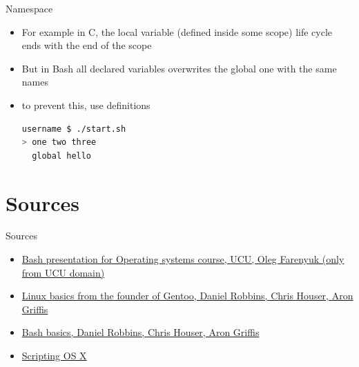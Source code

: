 \documentclass[usenames,dvipsnames,10pt,aspectratio=169]{beamer}
\begin{document}
\begin{frame}[fragile]{Namespace}
    \begin{itemize}
        \item For example in C, the local variable (defined inside some scope) life cycle ends with the end of the scope
        \item But in Bash all declared variables overwrites the global one with the same names
        \item to prevent this, use  definitions
        
        \begin{lstlisting}[language=Bash, style=shellstyle]
username $ ./start.sh
> one two three 
  global hello\end{lstlisting}
    \end{itemize}
\end{frame}

\section{Sources}
\begin{frame}{Sources}
\begin{itemize}
    \item \href{https://cms.ucu.edu.ua/pluginfile.php/181565/mod_resource/content/3/os_p01_bash.pdf}{Bash presentation for Operating systems course, UCU, Oleg Farenyuk (only from UCU domain)}
    \item \href{https://www.funtoo.org/Linux_Fundamentals,_Part_1}{Linux basics from the founder of Gentoo, Daniel Robbins, Chris Houser, Aron Griffis}
    \item \href{https://www.funtoo.org/Bash_by_Example,_Part_1}{Bash basics, Daniel Robbins, Chris Houser, Aron Griffis}
    \item \href {https://scriptingosx.com/}{Scripting OS X}
\end{itemize}    
\end{frame}
\end{document}
